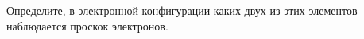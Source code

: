 Определите, в электронной конфигурации каких двух из этих элементов наблюдается проскок электронов.\\
